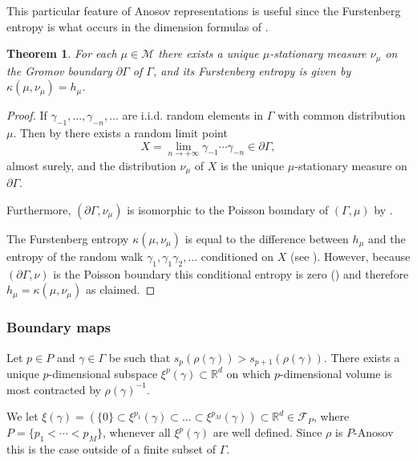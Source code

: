 \documentclass[JEP,XML,SOM,Unicode,NoEqCountersInSection,published]{cedram}
\newtheorem{theorem}{Theorem}[section]
\newcommand{\R}{\mathbb{R}}
\newcommand{\F}{\mathcal{F}}
\newcommand{\M}{\mathcal M}
\let\g\gamma
\begin{document}
This particular feature of Anosov representations is useful since the Furstenberg entropy is what occurs in the dimension formulas of \cite{LL23}.


\begin{theorem}\label{furstenberg}
For each \(\mu \in \M\) there exists a unique \(\mu\)-stationary measure \(\nu_\mu\) on the Gromov boundary \(\partial \Gamma\) of \(\Gamma\), and its Furstenberg entropy is given by \(\kappa(\mu,\nu_\mu) = h_\mu\).
\end{theorem}
\begin{proof}
If \(\g_{-1},\ldots, \g_{-n},\ldots\) are i.i.d. random elements in \(\Gamma\) with common distribution \(\mu\). Then by \cite[Th.\,7.6]{Kai00} there exists a random limit point
\[
X = \lim_{n \to +\infty}\g_{-1}\cdots \g_{-n} \in \partial\Gamma,
\]
almost surely, and the distribution \(\nu_\mu\) of \(X\) is the unique \(\mu\)-stationary measure on \(\partial \Gamma\).

Furthermore, \((\partial \Gamma,\nu_\mu)\) is isomorphic to the Poisson boundary of \((\Gamma,\mu)\) by \cite[Th.\,7.7]{Kai00}.

The Furstenberg entropy \(\kappa(\mu,\nu_\mu)\) is equal to the difference between \(h_\mu\) and the entropy of the random walk \(\g_1, \g_1\g_2,\ldots\) conditioned on \(X\) (see \cite[Cor.\,2]{KV83}). However, because \((\partial \Gamma,\nu)\) is the Poisson boundary this conditional entropy is zero (\cite[Th.\,4.3 and 4.5]{Kai00}) and therefore \(h_\mu = \kappa(\mu,\nu_\mu)\) as claimed.
\end{proof}

\subsubsection{Boundary maps}

Let \(p \in P \) and \(\gamma \in \Gamma\) be such that \(s_p(\rho(\gamma)) > s_{p+1}(\rho(\gamma))\).
There exists a unique \(p\)-dimensional subspace \(\xi^p(\gamma) \subset \R^d\) on which \(p\)-dimensional volume is most contracted by \(\rho(\gamma)^{-1}\).

We let \(\xi(\gamma) = (\{0\} \!\subset\! \xi^{p_1}(\gamma) \!\subset\! \ldots \!\subset\! \xi^{p_{M}}(\gamma))\!\subset\! \R^d \in \F_P\), where \hbox{\(P = \lbrace p_1 < \cdots < p_{M} \rbrace\)}, whenever all \(\xi^p(\gamma)\) are well defined.
Since \(\rho\) is \(P\)-Anosov this is the case outside of a finite subset of \(\Gamma\).
\end{document}
